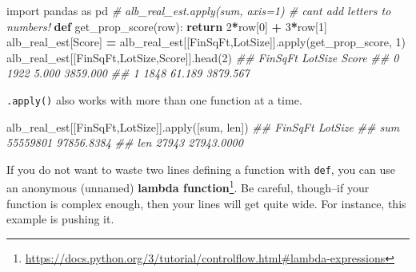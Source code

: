 \documentclass[
  12pt,
]{krantz}
\makeatletter
\newenvironment{Shaded}{\begin{snugshade}}{\end{snugshade}}
\newcommand{\BuiltInTok}[1]{#1}
\newcommand{\CommentTok}[1]{\textcolor[rgb]{0.37,0.37,0.37}{\textit{#1}}}
\newcommand{\ControlFlowTok}[1]{\textcolor[rgb]{0.27,0.27,0.27}{\textbf{#1}}}
\newcommand{\DecValTok}[1]{\textcolor[rgb]{0.06,0.06,0.06}{#1}}
\newcommand{\ImportTok}[1]{#1}
\newcommand{\KeywordTok}[1]{\textcolor[rgb]{0.27,0.27,0.27}{\textbf{#1}}}
\newcommand{\NormalTok}[1]{#1}
\newcommand{\OperatorTok}[1]{\textcolor[rgb]{0.43,0.43,0.43}{\textbf{#1}}}
\newcommand{\StringTok}[1]{\textcolor[rgb]{0.5,0.5,0.5}{#1}}
\renewcommand{\href}[2]{#2\footnote{\url{#1}}}
\newenvironment{kframe}{%
\medskip{}
\setlength{\fboxsep}{.8em}
 \def\at@end@of@kframe{}%
 \ifinner\ifhmode%
  \def\at@end@of@kframe{\end{minipage}}%
  \begin{minipage}{\columnwidth}%
 \fi\fi%
 \def\FrameCommand##1{\hskip\@totalleftmargin \hskip-\fboxsep
 \colorbox{shadecolor}{##1}\hskip-\fboxsep
     \hskip-\linewidth \hskip-\@totalleftmargin \hskip\columnwidth}%
 \MakeFramed {\advance\hsize-\width
   \@totalleftmargin\z@ \linewidth\hsize
   \@setminipage}}%
 {\par\unskip\endMakeFramed%
 \at@end@of@kframe}
\renewenvironment{Shaded}{\begin{kframe}}{\end{kframe}}
\makeatother
\begin{document}
\begin{Shaded}
\begin{Highlighting}[]
\ImportTok{import}\NormalTok{ pandas }\ImportTok{as}\NormalTok{ pd}
\CommentTok{\# alb\_real\_est.apply(sum, axis=1) \# can\textquotesingle{}t add letters to numbers!}
\KeywordTok{def}\NormalTok{ get\_prop\_score(row):}
  \ControlFlowTok{return} \DecValTok{2}\OperatorTok{*}\NormalTok{row[}\DecValTok{0}\NormalTok{] }\OperatorTok{+} \DecValTok{3}\OperatorTok{*}\NormalTok{row[}\DecValTok{1}\NormalTok{]}
\NormalTok{alb\_real\_est[}\StringTok{\textquotesingle{}Score\textquotesingle{}}\NormalTok{] }\OperatorTok{=}\NormalTok{ alb\_real\_est[[}\StringTok{\textquotesingle{}FinSqFt\textquotesingle{}}\NormalTok{,}\StringTok{\textquotesingle{}LotSize\textquotesingle{}}\NormalTok{]].}\BuiltInTok{apply}\NormalTok{(get\_prop\_score, }\DecValTok{1}\NormalTok{)}
\NormalTok{alb\_real\_est[[}\StringTok{\textquotesingle{}FinSqFt\textquotesingle{}}\NormalTok{,}\StringTok{\textquotesingle{}LotSize\textquotesingle{}}\NormalTok{,}\StringTok{\textquotesingle{}Score\textquotesingle{}}\NormalTok{]].head(}\DecValTok{2}\NormalTok{)}
\CommentTok{\#\#    FinSqFt  LotSize     Score}
\CommentTok{\#\# 0     1922    5.000  3859.000}
\CommentTok{\#\# 1     1848   61.189  3879.567}
\end{Highlighting}
\end{Shaded}

\texttt{.apply()} also works with more than one function at a time.

\begin{Shaded}
\begin{Highlighting}[]
\NormalTok{alb\_real\_est[[}\StringTok{\textquotesingle{}FinSqFt\textquotesingle{}}\NormalTok{,}\StringTok{\textquotesingle{}LotSize\textquotesingle{}}\NormalTok{]].}\BuiltInTok{apply}\NormalTok{([}\BuiltInTok{sum}\NormalTok{, }\BuiltInTok{len}\NormalTok{])}
\CommentTok{\#\#       FinSqFt     LotSize}
\CommentTok{\#\# sum  55559801  97856.8384}
\CommentTok{\#\# len     27943  27943.0000}
\end{Highlighting}
\end{Shaded}

If you do not want to waste two lines defining a function with \texttt{def}, you can use an anonymous (unnamed) \href{https://docs.python.org/3/tutorial/controlflow.html\#lambda-expressions}{\textbf{lambda function}}. Be careful, though--if your function is complex enough, then your lines will get quite wide. For instance, this example is pushing it.
\end{document}
